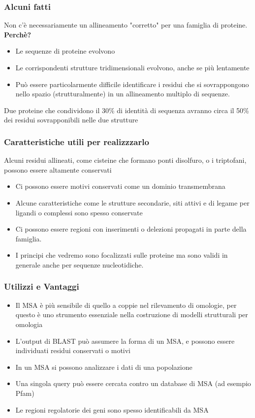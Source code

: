 \documentclass{article}
\begin{document}
\subsubsection{Alcuni fatti}
Non c'è necessariamente un allineamento "corretto" per una famiglia di proteine.\\
\textbf{Perchè?}
    \begin{itemize}
        \item Le sequenze di proteine evolvono
        \item Le corrispondenti strutture tridimensionali evolvono, anche se più lentamente
        \item Può essere particolarmente difficile identificare i residui che si sovrappongono nello spazio (strutturalmente) in un allineamento multiplo di sequenze.
    \end{itemize}
Due proteine che condividono il 30\% di identità di sequenza avranno circa il 50\% dei residui sovrapponibili nelle due strutture
\subsubsection{Caratteristiche utili per realizzzarlo}
Alcuni residui allineati, come cisteine che formano ponti disolfuro, o i triptofani, possono essere altamente conservati
    \begin{itemize}
        \item Ci possono essere motivi conservati come un dominio transmembrana
        \item Alcune caratteristiche come le strutture secondarie, siti attivi e di legame per ligandi o complessi sono spesso conservate
        \item Ci possono essere regioni con inserimenti o delezioni propagati in parte della famiglia.
        \item I principi che vedremo sono focalizzati sulle proteine ma sono validi in generale anche per sequenze nucleotidiche.
    \end{itemize}
\subsubsection{Utilizzi e Vantaggi}
    \begin{itemize}
        \item Il MSA è più sensibile di quello a coppie nel rilevamento di omologie, per questo è uno strumento essenziale nella costruzione di modelli strutturali per omologia
        \item L'output di BLAST può assumere la forma di un MSA, e possono essere individuati residui conservati o motivi
        \item In un MSA si possono analizzare i dati di una popolazione
        \item Una singola query può essere cercata contro un database di MSA (ad esempio Pfam)
        \item Le regioni regolatorie dei geni sono spesso identificabili da MSA
    \end{itemize}
\end{document}
